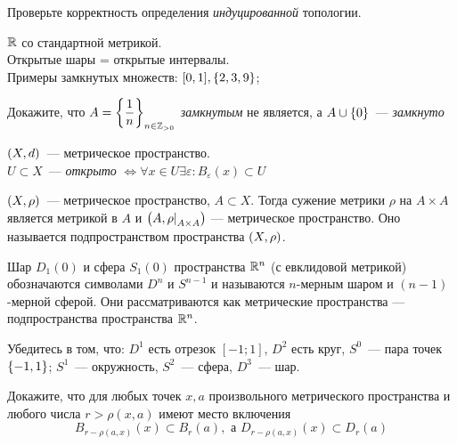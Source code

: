 \documentclass{article}
\begin{document}
    \begin{task_boxed}
        Проверьте корректность определения \textit{индуцированной} топологии.
    \end{task_boxed}

    \begin{example}
        $\R$ со стандартной метрикой.\\
        Открытые шары = открытые интервалы.\\
        Примеры замкнутых множеств: $[0,1], \set*{2, 3, 9}$;
    \end{example}

    \begin{task_boxed}
        Докажите, что $A = \set*{\dfrac{1}{n}}_{n \in \Z_{>0}}$ \textit{замкнутым} не является, а
        $A \cup \set*{0}$~--- \textit{замкнуто}
    \end{task_boxed}


    \begin{task_boxed}
        $\lr*{X, d}$~--- метрическое пространство.\\
        $U \subset X$~--- \textit{открыто} $\Leftrightarrow \forall x \in U \exists \varepsilon: B_{\varepsilon}(x) \subset U$
    \end{task_boxed}


    \begin{definition_boxed}
        $\lr*{X, \rho}$~--- метрическое пространство, $A \subset X$.
        Тогда сужение метрики $\rho$ на $A \times A$ является метрикой в $A$ и $\lr*{A, \restr{\rho}{A\times A}}$ — метрическое пространство.
        Оно называется подпространством пространства $\lr*{X, \rho}$.
    \end{definition_boxed}

    \begin{definition_boxed}
        Шар $D_1(0)$ и сфера $S_1(0)$ пространства $\R^n$ (с евклидовой метрикой) обозначаются символами $D^n$ и $S^{n-1}$ и называются $n$-мерным шаром и $(n-1)$-мерной
        сферой.
        Они рассматриваются как метрические пространства — подпространства пространства $\R^n$.
    \end{definition_boxed}

    \begin{example}
        Убедитесь в том, что: $D^1$ есть отрезок $[-1;1]$, $D^2$ есть круг, $S^0$~--- пара
        точек $\set{-1, 1}$; $S^1$~--- окружность, $S^2$~--- сфера, $D^3$~--- шар.
    \end{example}

    \begin{task_boxed}
        Докажите, что для любых точек $x, a$ произвольного метрического пространства и любого числа $r > \rho(x, a)$ имеют место включения
        \[
            B_{r - \rho(a, x)}(x) \subset B_r(a), \text{ а } D_{r - \rho(a, x)}(x) \subset D_r(a)
        \]
    \end{task_boxed}
\end{document}
